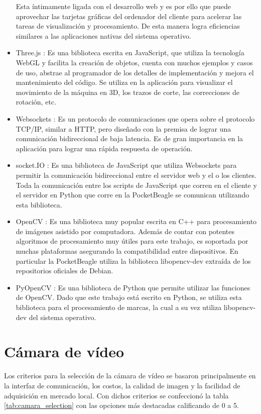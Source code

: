 \begin{itemize}
{         Esta íntimamente ligada con el desarrollo web y es por ello que puede aprovechar las tarjetas gráficas del ordenador del cliente para acelerar las tareas de visualización y procesamiento.
         De esta manera logra eficiencias similares a las aplicaciones nativas del sistema operativo.
      }
      \item{Three.js \citep{WEBSITE:threejs}: Es una biblioteca escrita en JavaScript, que utiliza la tecnología WebGL y facilita la creación de objetos, cuenta con muchos ejemplos y casos de uso, abstrae al programador de los detalles de implementación y mejora el mantenimiento del código.
         Se utiliza en la aplicación para visualizar el movimiento de la máquina en 3D, los trazos de corte, las correcciones de rotación, etc.
      }
      \item{Websockets \citep{WEBSITE:websockets}: Es un protocolo de comunicaciones que opera sobre el protocolo TCP/IP, similar a HTTP, pero diseñado con la premisa de lograr una comunicación bidireccional de baja latencia.
         Es de gran importancia en la aplicación para lograr una rápida respuesta de operación.
      }
      \item{socket.IO \citep{WEBSITE:socketio}: Es una biblioteca de JavaScript que utiliza Websockets para permitir la comunicación bidireccional entre el servidor web y el o los clientes.
         Toda la comunicación entre los scripts de JavaScript que corren en el cliente y el servidor en Python que corre en la PocketBeagle se comunican utilizando esta biblioteca.
      }
   \item{OpenCV \citep{WEBSITE:opencv}: Es una biblioteca muy popular escrita en C++ para procesamiento de imágenes asistido por computadora.
         Además de contar con potentes algoritmos de procesamiento muy útiles para este trabajo, es soportada por muchas plataformas asegurando la compatibilidad entre dispositivos.
         En particular la PocketBeagle utiliza la biblioteca libopencv-dev extraída de los repositorios oficiales de Debian.
      }
   \item{PyOpenCV \citep{WEBSITE:pyopencv}: Es una biblioteca de Python que permite utilizar las funciones de OpenCV.
         Dado que este trabajo está escrito en Python, se utiliza esta biblioteca para el procesamiento de marcas, la cual a su vez utiliza libopencv-dev del sistema operativo.
      }
\end{itemize}

\section{Cámara de vídeo}
\label{section:camara_de_video}
   Los criterios para la selección de la cámara de vídeo se basaron principalmente en la interfaz de comunicación, los costos, la calidad de imagen y la facilidad de adquisición en mercado local. 
   Con dichos criterios se confeccionó la tabla \ref{tab:camara_selection} con las opciones más destacadas calificando de 0 a 5.

